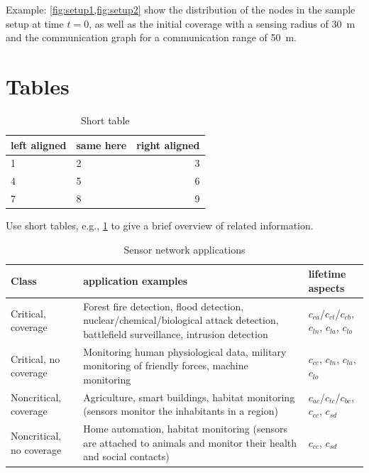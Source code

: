 \documentclass[]{ccs-thesis}
\begin{document}
{Example: \cref{fig:setup1,fig:setup2} show the distribution of the nodes in the sample setup at time $t=0$, as well as the initial coverage with a sensing radius of \SI{30}{\metre} and the communication graph for a communication range of \SI{50}{\metre}.

\clearpage
\section{Tables}

\begin{table}
	\centering
	\begin{tabular}{llr}
		\toprule
		left aligned & same here & right aligned \\
		\midrule
		1 & 2 & 3 \\
		4 & 5 & 6 \\
		7 & 8 & 9 \\
		\bottomrule
	\end{tabular}
	\caption{Short table}
	\label{tab:shorttable}
\end{table}

Use short tables, e.g., \cref{tab:shorttable} to give a brief overview of related information.

\begin{table}
	\centering
	\begin{tabular}{>{\raggedright}p{1.7cm}p{5.4cm}p{3.4cm}}
		\toprule
		Class & application examples & lifetime aspects \\
		\midrule
		Critical, coverage &
				Forest fire detection, flood detection, nuclear/chemical/biological attack detection, battlefield surveillance, intrusion detection &
				$c_{ca}$/$c_{ct}$/$c_{cb}$, $c_{ln}$, $c_{la}$, $c_{lo}$\\
		Critical, no coverage &
				Monitoring human physiological data, military monitoring of friendly forces, machine monitoring &
				$c_{cc}$, $c_{ln}$, $c_{la}$, $c_{lo}$ \\
		Noncritical, coverage &
				Agriculture, smart buildings, habitat monitoring (sensors monitor the inhabitants in a region) &
				$c_{ac}$/$c_{tc}$/$c_{bc}$, $c_{cc}$, $c_{sd}$ \\
		Noncritical, no coverage &
				Home automation, habitat monitoring (sensors are attached to animals and monitor their health and social contacts) &
				$c_{cc}$, $c_{sd}$ \\
		\bottomrule
	\end{tabular}
	\caption{Sensor network applications}
	\label{tab:SensorNetworkApplications}
\end{table}

}
\end{document}
